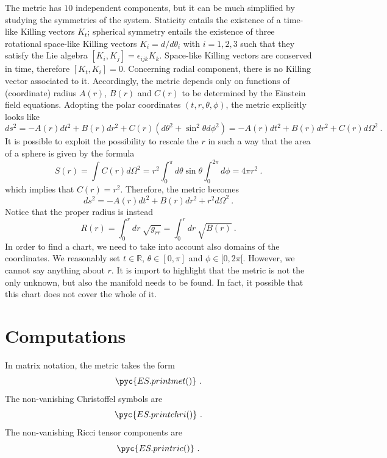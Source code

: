     The metric has $10$ independent components, but it can be much simplified by studying the symmetries of the system. Staticity entails the existence of a time-like Killing vectors $K_t$; spherical symmetry entails the existence of three rotational space-like Killing vectors $K_i = d / d \theta_i$ with $i=1,2,3$ such that they satisfy the Lie algebra $[K_i, K_j] = \epsilon_{ijk} K_k$. Space-like Killing vectors are conserved in time, therefore $[K_t, K_i] = 0$. Concerning radial component, there is no Killing vector associated to it. Accordingly, the metric depends only on functions of (coordinate) radius $A(r)$, $B(r)$ and $C(r)$ to be determined by the Einstein field equations. Adopting the polar coordinates $(t, r, \theta, \phi)$, the metric explicitly looks like 
    \begin{equation*}
        ds^2 = - A(r) dt^2 + B(r) dr^2 + C(r) (d\theta^2 + \sin^2 \theta d\phi^2 ) = - A(r) dt^2 + B(r) dr^2 + C(r) d \Omega^2  ~.
    \end{equation*}
    It is possible to exploit the possibility to rescale the $r$ in such a way that the area of a sphere is given by the formula
    \begin{equation*}
        S(r) = \int C(r) d\Omega^2 = r^2 \int_0^\pi d \theta \sin \theta \int_0^{2\pi} d\phi = 4 \pi r^2 ~.
    \end{equation*}
    which implies that $C(r) = r^2$. Therefore, the metric becomes
    \begin{equation*}
        ds^2 = - A(r) dt^2 + B(r) dr^2 + r^2 d \Omega^2 ~.
    \end{equation*}
    Notice that the proper radius is instead 
    \begin{equation}\label{prad}
        R(r) = \int_0^r dr ~ \sqrt{g_{rr}} = \int_0^r dr ~ \sqrt{B(r)} ~.
    \end{equation}
    In order to find a chart, we need to take into account also domains of the coordinates. We reasonably set $t \in \mathbb R$, $\theta \in [0, \pi]$ and $\phi \in [0, 2\pi[$. However, we cannot say anything about $r$. It is import to highlight that the metric is not the only unknown, but also the manifold needs to be found. In fact, it possible that this chart does not cover the whole of it.

\section{Computations}

    In matrix notation, the metric takes the form 
    \begin{equation*}
        \pyc{ES.printmet()} ~.
    \end{equation*}
    The non-vanishing Christoffel symbols are 
    \begin{equation*}
        \pyc{ES.printchri()} ~.
    \end{equation*}
    The non-vanishing Ricci tensor components are 
    \begin{equation*}
        \pyc{ES.printric()} ~.
    \end{equation*}

